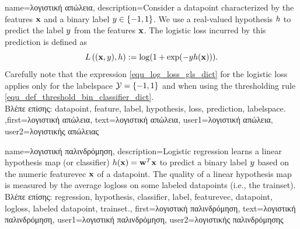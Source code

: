 {name={\foreignlanguage{greek}{λογιστική απώλεια}}, 
	description={Consider 
		a \gls{datapoint} characterized by the \gls{feature}s ${\bf x}$ and a binary \gls{label} $y \in \{-1,1\}$. 
		We use a real-valued \gls{hypothesis} $h$ to predict the \gls{label} $y$ 
		from the \gls{feature}s ${\bf x}$. The logistic \gls{loss} incurred by this \gls{prediction} is 
		defined as 
		\begin{equation} 
		\label{equ_log_loss_gls_dict}
		L\left(({\bf x},y),h \right) :=  \log ( 1 + \exp(- y h({\bf x}))).
		\end{equation}
		Carefully note that the expression \eqref{equ_log_loss_gls_dict} 
		for the logistic \gls{loss} applies only for the \gls{labelspace} $\mathcal{Y} = \{ -1,1\}$ and when using 
		the thresholding rule \eqref{equ_def_threshold_bin_classifier_dict}.\\
	\foreignlanguage{greek}{Βλέπε επίσης:} \gls{datapoint}, \gls{feature}, \gls{label}, \gls{hypothesis}, \gls{loss}, \gls{prediction}, \gls{labelspace}.
},first={\foreignlanguage{greek}{λογιστική απώλεια}},
text={\foreignlanguage{greek}{λογιστική απώλεια}},
user1={\foreignlanguage{greek}{λογιστική απώλεια}}, %
user2={\foreignlanguage{greek}{λογιστικής απώλειας}} %
}

{name={\foreignlanguage{greek}{λογιστική παλινδρόμηση}}, 
	description={Logistic \gls{regression} learns a 
		linear \gls{hypothesis} map (or \gls{classifier}) $h({\bf x}) = {\bf w}^{T} {\bf x}$ 
		to predict a binary \gls{label} $y$ based on the numeric \gls{featurevec} ${\bf x}$ of 
		a \gls{datapoint}. The quality of a linear \gls{hypothesis} map is measured by the average \gls{logloss} 
		on some \gls{labeled datapoint}s (i.e., the \gls{trainset}).\\
		\foreignlanguage{greek}{Βλέπε επίσης:} \gls{regression}, \gls{hypothesis}, \gls{classifier}, \gls{label}, \gls{featurevec}, \gls{datapoint}, \gls{logloss}, \gls{labeled datapoint}, \gls{trainset}.},
		first={\foreignlanguage{greek}{λογιστική παλινδρόμηση}},
		text={\foreignlanguage{greek}{λογιστική παλινδρόμηση}},
		user1={\foreignlanguage{greek}{λογιστική παλινδρόμηση}}, %
		user2={\foreignlanguage{greek}{λογιστικής παλινδρόμησης}} %
}

